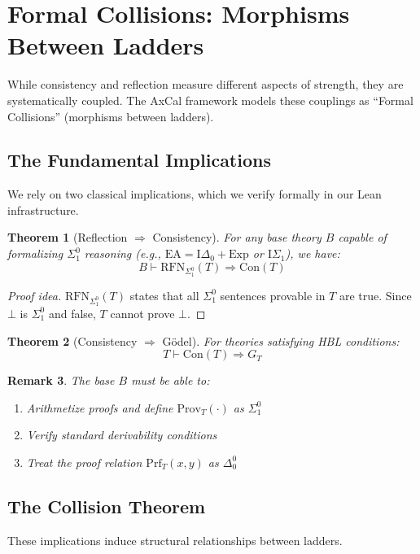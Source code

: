 \documentclass[11pt]{article}
\newtheorem{theorem}{Theorem}[section]
\newtheorem{remark}[theorem]{Remark}
\newcommand{\EA}{\mathrm{EA}}
\newcommand{\ISigma}{\mathrm{I}\Sigma_1}
\newcommand{\Con}{\mathrm{Con}}
\newcommand{\RFNSigOne}{\mathrm{RFN}_{\Sigma^0_1}}
\newcommand{\Prov}{\mathrm{Prov}}
\begin{document}
\section{Formal Collisions: Morphisms Between Ladders}

While consistency and reflection measure different aspects of strength, they are systematically coupled. The AxCal framework models these couplings as ``Formal Collisions'' (morphisms between ladders).

\subsection{The Fundamental Implications}
We rely on two classical implications, which we verify formally in our Lean infrastructure.

\begin{theorem}[Reflection $\Rightarrow$ Consistency]\label{thm:RFN-implies-Con}
For any base theory $B$ capable of formalizing $\Sigma^0_1$ reasoning (e.g., $\EA = \mathrm{I}\Delta_0 + \mathrm{Exp}$ or $\ISigma$), we have:
$$B \vdash \RFNSigOne(T) \Rightarrow \Con(T)$$
\end{theorem}
\begin{proof}[Proof idea]
$\RFNSigOne(T)$ states that all $\Sigma^0_1$ sentences provable in $T$ are true. Since $\bot$ is $\Sigma^0_1$ and false, $T$ cannot prove $\bot$.
\end{proof}

\begin{theorem}[Consistency $\Rightarrow$ Gödel]\label{thm:Con-implies-G}
For theories satisfying HBL conditions:
$$T \vdash \Con(T) \Rightarrow G_T$$
\end{theorem}

\begin{remark}
The base $B$ must be able to:
\begin{enumerate}
\item Arithmetize proofs and define $\Prov_T(\cdot)$ as $\Sigma^0_1$
\item Verify standard derivability conditions
\item Treat the proof relation $\mathrm{Prf}_T(x,y)$ as $\Delta^0_0$
\end{enumerate}
\end{remark}

\subsection{The Collision Theorem}
These implications induce structural relationships between ladders.
\end{document}
